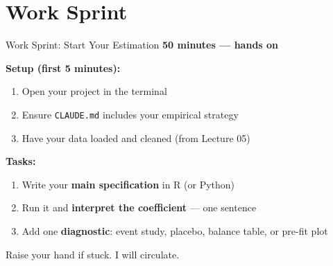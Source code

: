 
\section{Work Sprint}

\begin{frame}{Work Sprint: Start Your Estimation}
  \textbf{\textcolor{usfgreen}{50 minutes --- hands on}}

  \vspace{4pt}

  \textbf{Setup (first 5 minutes):}
  \begin{enumerate}
    \item Open your project in the terminal
    \item Ensure \texttt{CLAUDE.md} includes your empirical strategy
    \item Have your data loaded and cleaned (from Lecture 05)
  \end{enumerate}

  \vspace{4pt}

  \textbf{Tasks:}
  \begin{enumerate}
    \item[\textbf{1.}] Write your \textbf{main specification} in R (or Python)
    \item[\textbf{2.}] Run it and \textbf{interpret the coefficient} --- one sentence
    \item[\textbf{3.}] Add one \textbf{diagnostic}: event study, placebo, balance table, or pre-fit plot
  \end{enumerate}

  \vspace{4pt}

  Raise your hand if stuck. I will circulate.
\end{frame}

